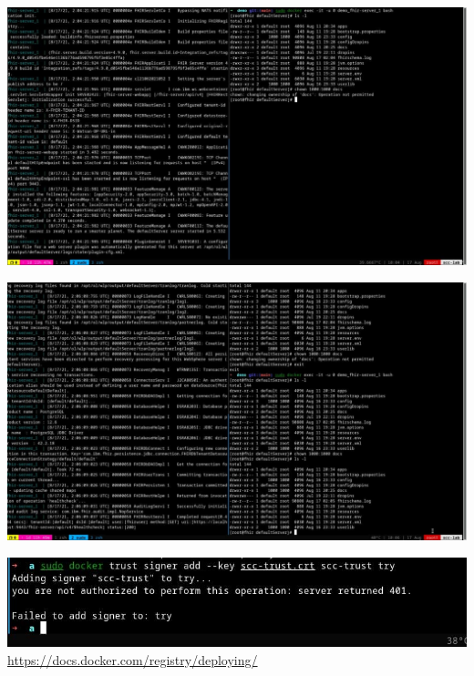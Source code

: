 \documentclass{beamer}
\begin{document}
\begin{CJK*}{UTF8}{bsmi}
  \begin{frame}
    \includegraphics[width=\textwidth]{photo_2021-08-17_10-04-54.jpg}
  \end{frame}

  \begin{frame}
    \includegraphics[width=\textwidth]{photo_2021-08-17_10-06-35.jpg}
  \end{frame}

  \begin{frame}
    \includegraphics[width=\textwidth]{photo_2021-08-20_11-52-25.jpg}
    \url{https://docs.docker.com/registry/deploying/}
  \end{frame}

\end{CJK*}
\end{document}
